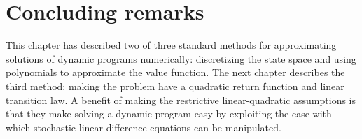 \section{Concluding remarks}
This chapter has described two of three standard methods for
approximating solutions of
dynamic programs numerically: discretizing the  state
space and using polynomials to approximate the value function.
  The next chapter describes the third method: making
the problem have a quadratic return function and linear
transition law.   A  benefit of making the  restrictive
linear-quadratic assumptions is that they make solving a dynamic
program easy by exploiting the ease with which
stochastic linear difference equations can be manipulated.

